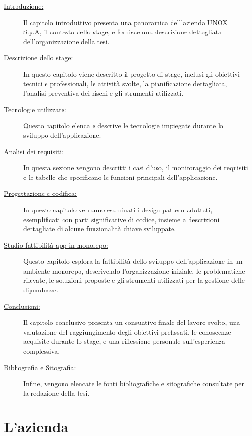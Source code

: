 \begin{description}
    \item[{\hyperref[chap:introduzione]{Introduzione:}}] Il capitolo introduttivo presenta una panoramica dell'azienda UNOX S.p.A, il contesto dello stage, e fornisce una descrizione dettagliata dell'organizzazione della tesi.
    \item[{\hyperref[chap:stage_descrizione]{Descrizione dello stage:}}] In questo capitolo viene descritto il progetto di stage, inclusi gli obiettivi tecnici e professionali, le attività svolte, la pianificazione dettagliata, l'analisi preventiva dei rischi e gli strumenti utilizzati.
    \item[{\hyperref[chap:tecnologie_utilizzate]{Tecnologie utilizzate:}}] Questo capitolo elenca e descrive le tecnologie impiegate durante lo sviluppo dell'applicazione.
    \item[{\hyperref[chap:analisi_requisiti]{Analisi dei requisiti:}}] In questa sezione vengono descritti i casi d'uso, il monitoraggio dei requisiti e le tabelle che specificano le funzioni principali dell'applicazione.
    \item[{\hyperref[chap:design_coding]{Progettazione e codifica:}}] In questo capitolo verranno esaminati i design pattern adottati, esemplificati con parti significative di codice, insieme a descrizioni dettagliate di alcune funzionalità chiave sviluppate.
    \item[{\hyperref[chap:studio_fattibilita]{Studio fattibilità app in monorepo:}}] Questo capitolo esplora la fattibilità dello sviluppo dell'applicazione in un ambiente monorepo, descrivendo l'organizzazione iniziale, le problematiche rilevate, le soluzioni proposte e gli strumenti utilizzati per la gestione delle dipendenze.
    \item[{\hyperref[chap:conclusioni]{Conclusioni:}}] Il capitolo conclusivo presenta un consuntivo finale del lavoro svolto, una valutazione del raggiungimento degli obiettivi prefissati, le conoscenze acquisite durante lo stage, e una riflessione personale sull'esperienza complessiva.
    \item[{\hyperref[cap:bibliography]{Bibliografia e Sitografia:}}] Infine, vengono elencate le fonti bibliografiche e sitografiche consultate per la redazione della tesi.
\end{description}
\pagebreak
\section{L'azienda}

